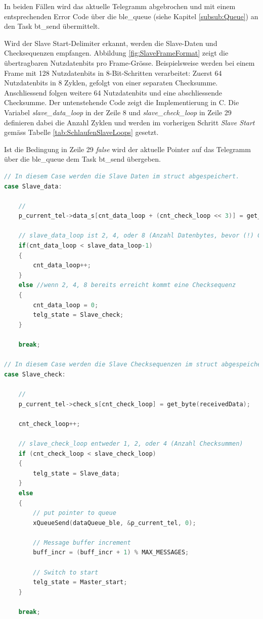 In beiden Fällen wird das aktuelle Telegramm abgebrochen und mit einem entsprechenden Error Code über die ble\_queue (siehe Kapitel \ref{subsub:Queue}) an den Task bt\_send übermittelt. 

Wird der Slave Start-Delimiter erkannt, werden die Slave-Daten und Checksequenzen empfangen. Abbildung \ref{fig:SlaveFrameFormat} zeigt die übertragbaren Nutzdatenbits pro Frame-Grösse. Beispielsweise werden bei einem Frame mit 128 Nutzdatenbits in 8-Bit-Schritten verarbeitet: Zuerst 64 Nutzdatenbits in 8 Zyklen, gefolgt von einer separaten Checksumme. Anschliessend folgen weitere 64 Nutzdatenbits und eine abschliessende Checksumme. Der untenstehende Code zeigt die Implementierung in C. Die Variabel \textit{slave\_data\_loop} in der Zeile 8 und \textit{slave\_check\_loop} in Zeile 29 definieren dabei die Anzahl Zyklen und werden im vorherigen Schritt \textit{Slave Start} gemäss Tabelle \ref{tab:SchlaufenSlaveLoops} gesetzt. 

Ist die Bedingung in Zeile 29 \textit{false} wird der aktuelle Pointer auf das Telegramm über die ble\_queue dem Task bt\_send übergeben. 


\begin{lstlisting}[language=C]
// In diesem Case werden die Slave Daten im struct abgespeichert.
case Slave_data:

    // 
    p_current_tel->data_s[cnt_data_loop + (cnt_check_loop << 3)] = get_byte(receivedData);

    // slave_data_loop ist 2, 4, oder 8 (Anzahl Datenbytes, bevor (!) Checksequenz folgt
    if(cnt_data_loop < slave_data_loop-1) 
    {
        cnt_data_loop++;
    } 
    else //wenn 2, 4, 8 bereits erreicht kommt eine Checksequenz
    {
        cnt_data_loop = 0;
        telg_state = Slave_check;
    }
    
    break;

// In diesem Case werden die Slave Checksequenzen im struct abgespeichert.
case Slave_check:

    // 
    p_current_tel->check_s[cnt_check_loop] = get_byte(receivedData);

    cnt_check_loop++;

    // slave_check_loop entweder 1, 2, oder 4 (Anzahl Checksummen)
    if (cnt_check_loop < slave_check_loop)
    {
        telg_state = Slave_data;
    } 
    else 
    {
        // put pointer to queue
        xQueueSend(dataQueue_ble, &p_current_tel, 0);

        // Message buffer increment 
        buff_incr = (buff_incr + 1) % MAX_MESSAGES;

        // Switch to start 
        telg_state = Master_start;
    }

    break;
\end{lstlisting}

